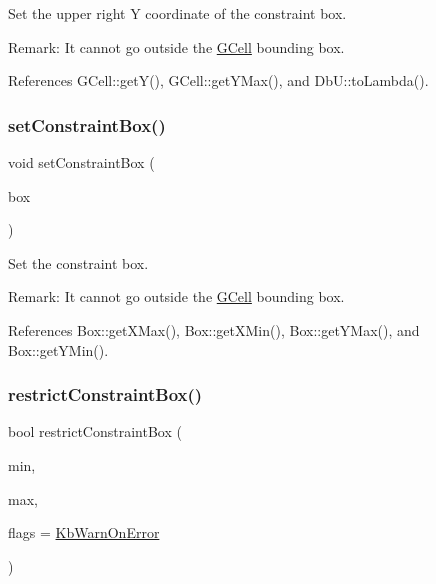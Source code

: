 Set the upper right Y coordinate of the constraint box.

\begin{DoxyParagraph}{Remark\+:}
It cannot go outside the \hyperlink{classKatabatic_1_1GCell}{G\+Cell} bounding box. 
\end{DoxyParagraph}


References G\+Cell\+::get\+Y(), G\+Cell\+::get\+Y\+Max(), and Db\+U\+::to\+Lambda().

\mbox{\label{classKatabatic_1_1AutoContact_a5e5f791613d0ef8f4cf9e7d8f35dc4c5}} 
\subsubsection{\texorpdfstring{set\+Constraint\+Box()}{setConstraintBox()}}
{\footnotesize\ttfamily void set\+Constraint\+Box (\begin{DoxyParamCaption}\item[{const \textbf{ Box} \&}]{box }\end{DoxyParamCaption})}

Set the constraint box.

\begin{DoxyParagraph}{Remark\+:}
It cannot go outside the \hyperlink{classKatabatic_1_1GCell}{G\+Cell} bounding box. 
\end{DoxyParagraph}


References Box\+::get\+X\+Max(), Box\+::get\+X\+Min(), Box\+::get\+Y\+Max(), and Box\+::get\+Y\+Min().

\mbox{\label{classKatabatic_1_1AutoContact_ac893802d1c5518cab86f8341af817abe}} 
\subsubsection{\texorpdfstring{restrict\+Constraint\+Box()}{restrictConstraintBox()}}
{\footnotesize\ttfamily bool restrict\+Constraint\+Box (\begin{DoxyParamCaption}\item[{\textbf{ Db\+U\+::\+Unit}}]{min,  }\item[{\textbf{ Db\+U\+::\+Unit}}]{max,  }\item[{unsigned int}]{flags = {\ttfamily \hyperlink{namespaceKatabatic_a2af2ad6b6441614038caf59d04b3b217aa5153b2cc25ebccca8616ce20ecd727a}{Kb\+Warn\+On\+Error}} }\end{DoxyParamCaption})}


